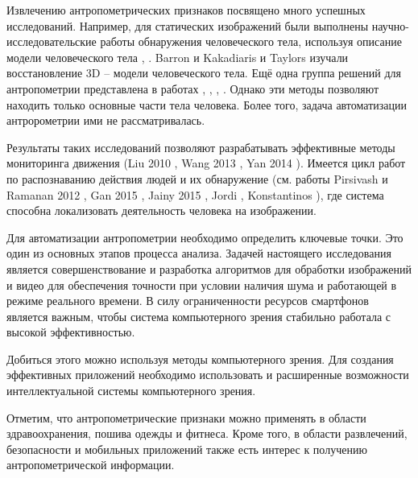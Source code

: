 Извлечению антропометрических признаков посвящено много успешных исследований. Например, для статических изображений были выполнены научно-исследовательские работы обнаружения человеческого тела, используя описание модели человеческого тела \cite{YuChen2011}, \cite{Albio2001}. Barron и Kakadiaris \cite{Barron2000} и Taylors \cite{Taylor2000} изучали восстановление 3D – модели человеческого тела. Ещё одна группа решений для антропометрии представлена в работах \cite{Micilotta2005}, \cite{Mikolajczyk2004}, \cite{Robert2004}, \cite{Ronfard2002}. Однако эти методы позволяют находить только основные части тела человека. Более того, задача автоматизации антророметрии ими не рассматривалась.

Результаты таких исследований позволяют разрабатывать эффективные методы мониторинга движения (Liu 2010 \cite{Liu2010}, Wang  2013 \cite{Wang2013},  Yan 2014 \cite{Yan2014}). Имеется цикл работ по распознаванию действия людей и их обнаружение (см. работы Pirsivash и Ramanan  2012 \cite{Pirsiavash2012}, Gan 2015 \cite{Gan2015}, Jainy 2015 \cite{Jainy2015}, Jordi \cite{Jordi2012}, Konstantinos \cite{Konstantinos2016}), где система способна локализовать деятельность человека на изображении.

Для автоматизации антропометрии необходимо определить ключевые точки. Это один из основных этапов процесса анализа. Задачей настоящего исследования является совершенствование и разработка алгоритмов для обработки изображений и видео для обеспечения точности при условии наличия шума и работающей в режиме реального времени. В силу ограниченности ресурсов смартфонов является важным, чтобы система компьютерного зрения стабильно работала с высокой эффективностью.

Добиться этого можно используя методы компьютерного зрения. Для создания эффективных приложений необходимо использовать и расширенные возможности интеллектуальной системы компьютерного зрения.

Отметим, что антропометрические признаки можно применять в области здравоохранения, пошива одежды и фитнеса. Кроме того, в области развлечений, безопасности и мобильных приложений также есть интерес к получению антропометрической информации.

